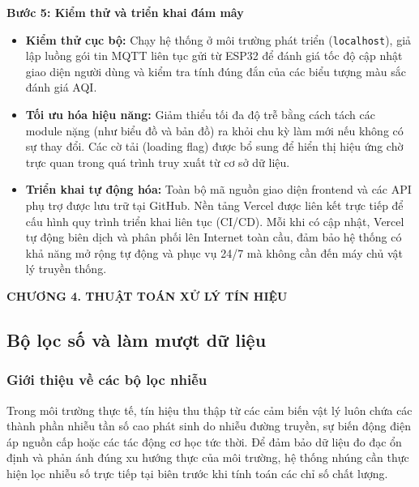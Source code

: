 \documentclass[12pt,a4paper]{article}
\begin{document}
\noindent\textbf{Bước 5: Kiểm thử và triển khai đám mây}
\begin{itemize}
    \item \textbf{Kiểm thử cục bộ:} Chạy hệ thống ở môi trường phát triển (\texttt{localhost}), giả lập luồng gói tin MQTT liên tục gửi từ ESP32 để đánh giá tốc độ cập nhật giao diện người dùng và kiểm tra tính đúng đắn của các biểu tượng màu sắc đánh giá AQI.
    \item \textbf{Tối ưu hóa hiệu năng:} Giảm thiểu tối đa độ trễ bằng cách tách các module nặng (như biểu đồ và bản đồ) ra khỏi chu kỳ làm mới nếu không có sự thay đổi. Các cờ tải (loading flag) được bổ sung để hiển thị hiệu ứng chờ trực quan trong quá trình truy xuất từ cơ sở dữ liệu.
    \item \textbf{Triển khai tự động hóa:} Toàn bộ mã nguồn giao diện frontend và các API phụ trợ được lưu trữ tại GitHub. Nền tảng Vercel được liên kết trực tiếp để cấu hình quy trình triển khai liên tục (CI/CD). Mỗi khi có cập nhật, Vercel tự động biên dịch  và phân phối lên Internet toàn cầu, đảm bảo hệ thống có khả năng mở rộng tự động và phục vụ 24/7 mà không cần đến máy chủ vật lý truyền thống.
\end{itemize}

\newpage


\newpage
\begin{center}
    \textbf{\Large CHƯƠNG 4. THUẬT TOÁN XỬ LÝ TÍN HIỆU}
\end{center}
\setcounter{section}{4}
\setcounter{subsection}{0}

\subsection{Bộ lọc số và làm mượt dữ liệu}

\subsubsection{Giới thiệu về các bộ lọc nhiễu}
Trong môi trường thực tế, tín hiệu thu thập từ các cảm biến vật lý luôn chứa các thành phần nhiễu tần số cao phát sinh do nhiễu đường truyền, sự biến động điện áp nguồn cấp hoặc các tác động cơ học tức thời. Để đảm bảo dữ liệu đo đạc ổn định và phản ánh đúng xu hướng thực của môi trường, hệ thống nhúng cần thực hiện lọc nhiễu số trực tiếp tại biên trước khi tính toán các chỉ số chất lượng.
\end{document}
